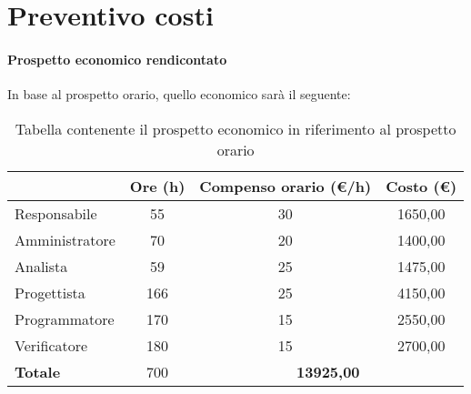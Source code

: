 \section{Preventivo costi}\label{section:preventivo_costi}

\paragraph{Prospetto economico rendicontato}
In base al prospetto orario, quello economico sarà il seguente:

\begin{table}[H]
  \centering
  \renewcommand{\arraystretch}{1.8}
	\begin{tabular}{l|ccc}
		\rowcolor[HTML]{125E28}
		\multicolumn{1}{c}{\color[HTML]{FFFFFF}\textbf{Ruolo}}
		& \color[HTML]{FFFFFF}\textbf{Ore (h)}
		& \color[HTML]{FFFFFF}\textbf{Compenso orario (€/h)}
		& \color[HTML]{FFFFFF}\textbf{Costo (€)} \\
		\hline
		Responsabile		& 55	& 30	& 1650,00 \\
		Amministratore	& 70  & 20	& 1400,00 \\
		Analista        & 59  & 25	& 1475,00 \\
		Progettista     & 166 & 25	& 4150,00 \\
		Programmatore 	& 170 & 15	& 2550,00	\\
		Verificatore		& 180 & 15	& 2700,00 \\
		\hline
		\rowcolor[HTML]{125E28}
		\color[HTML]{FFFFFF}\textbf{Totale} & \color[HTML]{FFFFFF}700 & \multicolumn{2}{c}{\color[HTML]{FFFFFF}\textbf{13925,00}}
	\end{tabular}
	\caption{Tabella contenente il prospetto economico in riferimento al prospetto orario}
\end{table}
